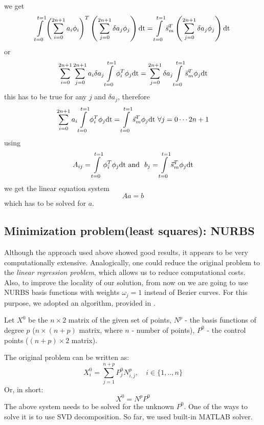 we get
\begin{equation}
\int\limits_{t=0}^{t=1} \left(\sum\limits_{i=0}^{2n+1} a_{i}\phi_i
\right)^T
\left(\sum\limits_{j=0}^{2n+1}
\delta a_{j} \phi_j\right)\dt 
=
\int\limits_{t=0}^{t=1}\vec{s}_m^T \left(\sum\limits_{j=0}^{2n+1} \delta a_{j} \phi_j\right)\dt
\end{equation}
or
\begin{equation}
\sum\limits_{i=0}^{2n+1} \sum\limits_{j=0}^{2n+1}
a_{i} \delta a_{j}\int\limits_{t=0}^{t=1} \phi_i^T
\phi_j\dt 
=
\sum\limits_{j=0}^{2n+1} \delta a_{j} \int\limits_{t=0}^{t=1}\vec{s}_m^T \phi_j\dt
\end{equation}
this has to be true for any $j$ and $\delta a_j$, therefore 
\begin{equation}
\sum\limits_{i=0}^{2n+1} a_{i} \int\limits_{t=0}^{t=1} \phi_i^T
\phi_j\dt 
=
\int\limits_{t=0}^{t=1}\vec{s}_m^T \phi_j\dt \ \forall j=0\cdots 2n+1
\end{equation}
using
\begin{equation}
A_{ij}=\int\limits_{t=0}^{t=1} \phi_i^T
\phi_j\dt 
\text{\ and \ }
b_j=\int\limits_{t=0}^{t=1}\vec{s}_m^T \phi_j\dt
\end{equation}
we get the linear equation system
\begin{equation}
A a = b
\end{equation}
which has to be solved for $a$.

\subsection{Minimization problem(least squares): NURBS}
Although the approach used above showed good results, it appears to be very computationally extensive. Analogically, one could reduce the original problem to the \textit{linear regression problem}, which allows us to reduce computational costs. Also, to improve the locality of our solution, from now on we are going to use NURBS basis functions with weights $\omega_{j} = 1$ instead of Bezier curves. For this purpose, we adopted an algorithm, provided in \cite{becker2011advanced}.

Let $X^{0}$ be the $n \times 2$ matrix of the given set of points, $N^{p}$ - the basis functions of degree $p$ ($n \times (n+p)$ matrix, where $n$ - number of points), $P^{0}$ - the control points ($(n+p) \times 2$ matrix).

The original problem can be written as:
\begin{equation}
X_{i}^{0} = \sum\limits_{j=1}^{n+p} P_{j}^{0} N_{i,j}^{p}, \quad i \in \{1,..,n\}
\end{equation}
Or, in short:
\begin{equation}
X^{0} = N^{p} P^{0}
\end{equation}
The above system needs to be solved for the unknown $P^{0}$. One of the ways to solve it is to use SVD decomposition. So far, we used built-in MATLAB solver.

